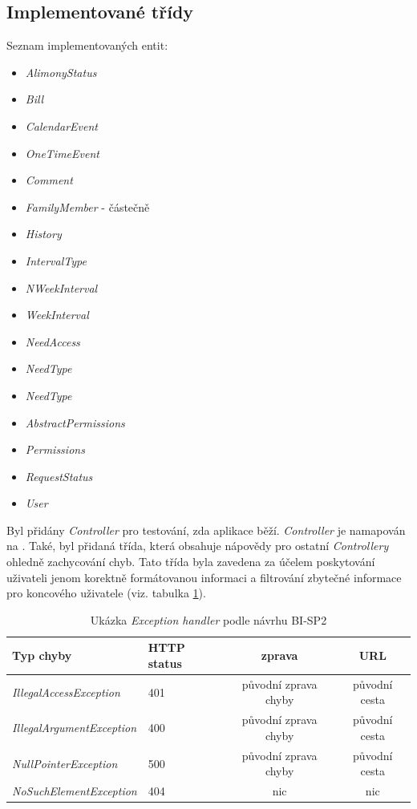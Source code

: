     \subsection{Implementované třídy}
        Seznam implementovaných entit:
        \begin{itemize}
            \item \textit{AlimonyStatus}
            \item \textit{Bill}
            \item \textit{CalendarEvent}
            \item \textit{OneTimeEvent}
            \item \textit{Comment}
            \item \textit{FamilyMember} - částečně
            \item \textit{History}
            \item \textit{IntervalType}
            \item \textit{NWeekInterval}
            \item \textit{WeekInterval}
            \item \textit{NeedAccess}
            \item \textit{NeedType}
            \item \textit{NeedType}
            \item \textit{AbstractPermissions}
            \item \textit{Permissions}
            \item \textit{RequestStatus}
            \item \textit{User}
        \end{itemize}
        
        Byl přidány \textit{Controller} pro testování, zda aplikace běží. \textit{Controller} je namapován na \textquote{/}. Také, byl přidaná třída, která obsahuje nápovědy pro ostatní \textit{Controllery} ohledně zachycování chyb. Tato třída byla zavedena za účelem poskytování uživateli jenom korektně formátovanou informaci  a filtrování zbytečné informace pro koncového uživatele (viz. tabulka \ref{tab:excpetion-handler1}). 
        \begin{table}\centering
	    \caption[Exception handler]{Ukázka \textit{Exception handler} podle návrhu BI-SP2}\label{tab:excpetion-handler1}
	    \begin{tabular}{|l|l|c|c|}\hline
		  Typ chyby		& HTTP status		& zprava	& URL	\tabularnewline \hline \hline
		  \textit{IllegalAccessException}	& 401	& původní zprava chyby		& původní cesta     \tabularnewline \hline
		  \textit{IllegalArgumentException}	& 400	& původní zprava chyby		& původní cesta     \tabularnewline \hline
		  \textit{NullPointerException}	& 500	& původní zprava chyby		& původní cesta     \tabularnewline \hline
		  \textit{NoSuchElementException}	& 404	& nic		& nic     \tabularnewline \hline
	    \end{tabular}
        \end{table}
    
